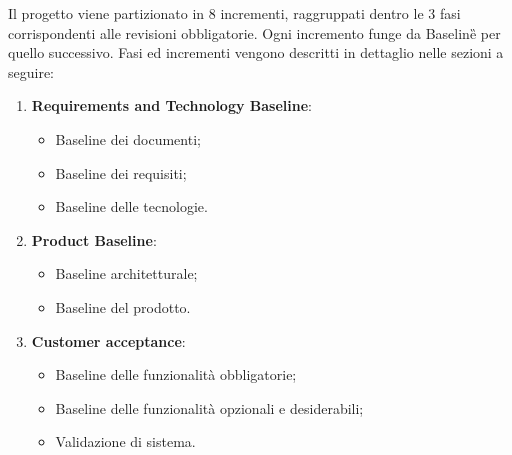 Il progetto viene partizionato in 8 incrementi, raggruppati dentro le 3 fasi corrispondenti alle revisioni obbligatorie. Ogni incremento funge da Baseline\G{} per quello successivo. Fasi ed incrementi vengono descritti in dettaglio nelle sezioni a seguire:
\begin{enumerate}
    \item \textbf{Requirements and Technology Baseline}:
    \begin{itemize} 
    \item Baseline dei documenti;
    \item Baseline dei requisiti;
    \item Baseline delle tecnologie.
    \end{itemize}
    \item \textbf{Product Baseline}:
    \begin{itemize} 
        \item Baseline architetturale; 
        \item Baseline del prodotto.
    \end{itemize}
    \item \textbf{Customer acceptance}:
    \begin{itemize}
        \item Baseline delle funzionalità obbligatorie;
        \item Baseline delle funzionalità opzionali e desiderabili;
        \item Validazione di sistema.
    \end{itemize}
\end{enumerate}

